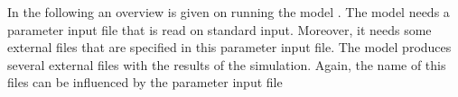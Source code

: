 
In the following an overview is given on running the model
\shy{}. The model needs a parameter input file that is read
on standard input. Moreover, it needs some external files that
are specified in this parameter input file. The model produces
several external files with the results of the simulation. Again,
the name of this files can be influenced by the parameter input file


